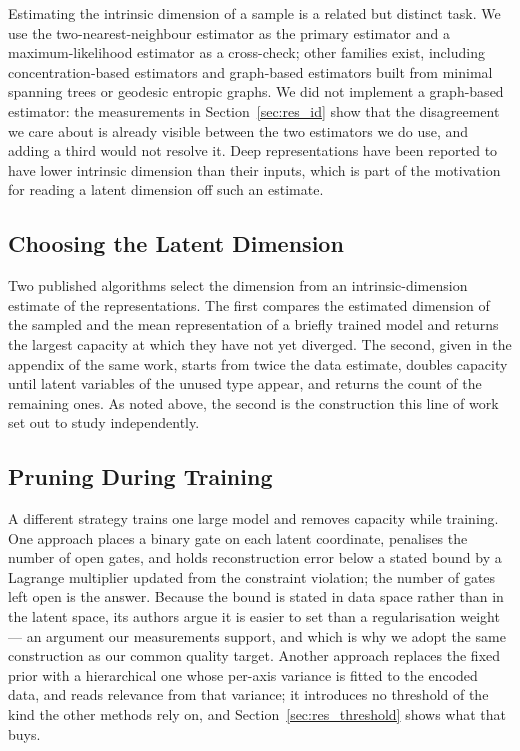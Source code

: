 \documentclass[make,article,submit,pdftex,moreauthors]{Definitions/mdpi}
\begin{document}
Estimating the intrinsic dimension of a sample is a related but distinct
task. We use the two-nearest-neighbour estimator as the primary estimator
and a maximum-likelihood estimator as a cross-check; other families exist,
including concentration-based estimators and graph-based estimators built
from minimal spanning trees or geodesic entropic graphs. We did not
implement a graph-based estimator: the measurements in
Section~\ref{sec:res_id} show that the disagreement we care about is
already visible between the two estimators we do use, and adding a third
would not resolve it. Deep representations have been reported to have
lower intrinsic dimension than their inputs, which is part of the
motivation for reading a latent dimension off such an estimate.

\subsection{Choosing the Latent Dimension}\label{sec:rel_select}

Two published algorithms select the dimension from an intrinsic-dimension
estimate of the representations. The first compares the estimated
dimension of the sampled and the mean representation of a briefly trained
model and returns the largest capacity at which they have not yet
diverged. The second, given in the appendix of the same work, starts from
twice the data estimate, doubles capacity until latent variables of the
unused type appear, and returns the count of the remaining ones. As noted
above, the second is the construction this line of work set out to study
independently.

\subsection{Pruning During Training}\label{sec:rel_prune}

A different strategy trains one large model and removes capacity while
training. One approach places a binary gate on each latent coordinate,
penalises the number of open gates, and holds reconstruction error below a
stated bound by a Lagrange multiplier updated from the constraint
violation; the number of gates left open is the answer. Because the bound
is stated in data space rather than in the latent space, its authors argue
it is easier to set than a regularisation weight --- an argument our
measurements support, and which is why we adopt the same construction as
our common quality target. Another approach replaces the fixed prior with
a hierarchical one whose per-axis variance is fitted to the encoded data,
and reads relevance from that variance; it introduces no threshold of the
kind the other methods rely on, and Section~\ref{sec:res_threshold} shows
what that buys.
\end{document}
